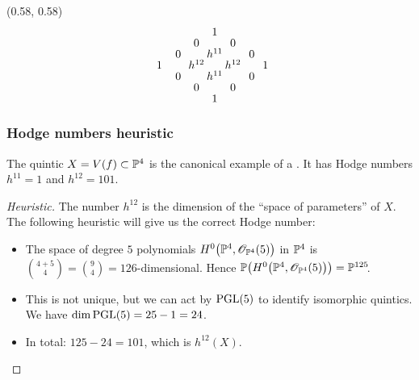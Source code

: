 \begin{frame}
{
    \begin{textblock}{0.4}(0.58, 0.58)
        \[
            \arraycolsep = 1pt%
            \def\arraystretch{0.5}%
            \begin{array}[c]{ccccccc}
                \phantom{h^03}  & \phantom{h^{02}} & \phantom{20} & 1 \\
                &&  0 && 0      & \phantom{h^30}                      \\
                &   0 && h^{11} && 0                                  \\
                    1 && h^{12} && h^{12} && 1                        \\
                &   0 && h^{11} && 0                                  \\
                &&  0 && 0 \vphantom{h^{32}}                          \\
                &&& 1 &&   \vphantom{h^{33}}
            \end{array}
        \]
    \end{textblock}
}
\end{frame}

\begin{frame}
\frametitle{Hodge numbers heuristic}

The quintic $X = V(f) \subset \P^4$ is the canonical example of a \CY. It has Hodge numbers $h^{11}=1$ and $h^{12}=101$.

\pause

\begin{proof}[Heuristic]
    The number $h^{12}$ is the dimension of the ``space of parameters'' of $X$. The following heuristic will give us the correct Hodge number:
    \pause
    \begin{itemize}[<+->]
      \item
      The space of degree $5$ polynomials $H^0\big(\P^4, \OO_{\P^4}(5)\big)$ in $\P^4$ is $\binom{4 + 5}{4} = \binom{9}{4} = 126$-dimensional. Hence $\P\big(H^0\big(\P^4, \OO_{\P^4}(5)\big)\big) = \P^{125}\mkern-4mu$.

      \item
      This is not unique, but we can act by $\PGL(5)$ to identify isomorphic quintics. We have $\dim \PGL(5)=25-1=24$.

      \item
      In total: $125 - 24 = 101$, which is $h^{12}(X)$.
      \qedhere
    \end{itemize}
\end{proof}

\end{frame}